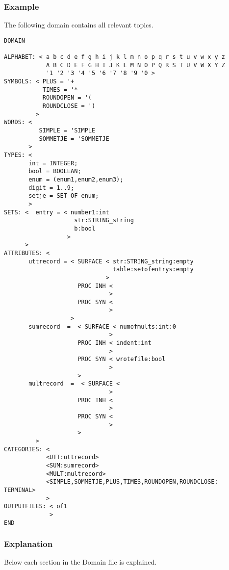\subsubsection{Example}
The following domain contains all relevant topics.
\begin{verbatim}
DOMAIN

ALPHABET: < a b c d e f g h i j k l m n o p q r s t u v w x y z
            A B C D E F G H I J K L M N O P Q R S T U V W X Y Z
            '1 '2 '3 '4 '5 '6 '7 '8 '9 '0 >
SYMBOLS: < PLUS = '+
           TIMES = '*
           ROUNDOPEN = '(
           ROUNDCLOSE = ')
         >
WORDS: <
          SIMPLE = 'SIMPLE
          SOMMETJE = 'SOMMETJE
       >
TYPES: <
       int = INTEGER;
       bool = BOOLEAN;
       enum = (enum1,enum2,enum3);
       digit = 1..9;
       setje = SET OF enum;
       >
SETS: <  entry = < number1:int
                    str:STRING_string
                    b:bool
                  >
      >
ATTRIBUTES: <
       uttrecord = < SURFACE < str:STRING_string:empty
                               table:setofentrys:empty
                             >
                     PROC INH <
                              >
                     PROC SYN <
                              >
                   >
       sumrecord  =  < SURFACE < numofmults:int:0
                              >
                     PROC INH < indent:int
                              >
                     PROC SYN < wrotefile:bool
                              >
                     >
       multrecord  =  < SURFACE <
                              >
                     PROC INH <
                              >
                     PROC SYN <
                              >
                     >
         >
CATEGORIES: <
            <UTT:uttrecord>
            <SUM:sumrecord>
            <MULT:multrecord>
            <SIMPLE,SOMMETJE,PLUS,TIMES,ROUNDOPEN,ROUNDCLOSE: TERMINAL>
            >
OUTPUTFILES: < of1
             >
END
\end{verbatim}
\subsubsection{Explanation}
Below each section in the Domain file is explained.

